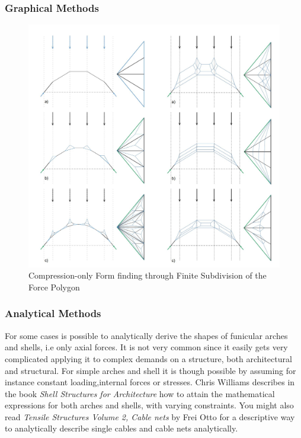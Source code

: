 \subsubsection{Graphical Methods}




\begin{figure}[H]
\centering
\includegraphics[width=0.6\linewidth ]{figure/Theory/graphStatEx.JPG}
\caption{Compression-only Form finding through Finite Subdivision of the
Force Polygon }
\end{figure}


\subsubsection{Analytical Methods}

For some cases is possible to analytically derive the shapes of funicular arches and shells, i.e only axial forces. It is not very common since it easily gets very complicated applying it to complex demands on a structure, both architectural and structural. For simple arches and shell it is though possible by assuming for instance constant loading,internal forces or stresses.  Chris Williams describes in the book \textit{Shell Structures for Architecture} how to attain the mathematical expressions for both arches and shells, with varying constraints.
You might also read \textit{ Tensile Structures Volume 2,  Cable nets} by Frei Otto for a descriptive way to analytically describe single cables and cable nets analytically. 

